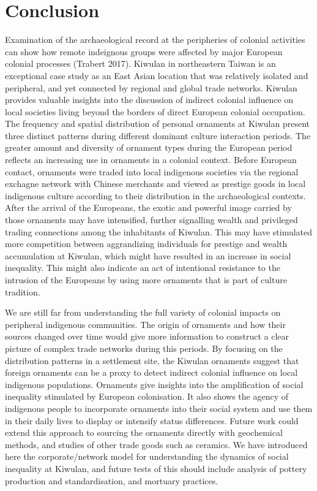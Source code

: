 \documentclass[]{article}
\begin{document}
\hypertarget{conclusion}{%
\section{Conclusion}\label{conclusion}}

Examination of the archaeological record at the peripheries of colonial
activities can show how remote indeignous groups were affected by major
European colonial processes (Trabert 2017). Kiwulan in northeastern
Taiwan is an exceptional case study as an East Asian location that was
relatively isolated and peripheral, and yet connected by regional and
global trade networks. Kiwulan provides valuable insights into the
discussion of indirect colonial influence on local societies living
beyond the borders of direct European colonial occupation. The frequency
and spatial distribution of personal ornaments at Kiwulan present three
distinct patterns during different dominant culture interaction periods.
The greater amount and diversity of ornament types during the European
period reflects an increasing use in ornaments in a colonial context.
Before European contact, ornaments were traded into local indigenous
societies via the regional exchagne network with Chinese merchants and
viewed as prestige goods in local indigenous culture according to their
distribution in the archaeological contexts. After the arrival of the
Europeans, the exotic and powerful image carried by those ornaments may
have intensified, further signalling wealth and privileged trading
connections among the inhabitants of Kiwulan. This may have stimulated
more competition between aggrandizing individuals for prestige and
wealth accumulation at Kiwulan, which might have resulted in an increase
in social inequality. This might also indicate an act of intentional
resistance to the intrusion of the Europeans by using more ornaments
that is part of culture tradition.

We are still far from understanding the full variety of colonial impacts
on peripheral indigenous communities. The origin of ornaments and how
their sources changed over time would give more information to construct
a clear picture of complex trade networks during this periods. By
focusing on the distribution patterns in a settlement site, the Kiwulan
ornaments suggest that foreign ornaments can be a proxy to detect
indirect colonial influence on local indigenous populations. Ornaments
give insights into the amplification of social inequality stimulated by
European colonisation. It also shows the agency of indigenous people to
incorporate ornaments into their social system and use them in their
daily lives to display or intensify status differences. Future work
could extend this approach to sourcing the ornaments directly with
geochemical methods, and studies of other trade goods such as ceramics.
We have introduced here the corporate/network model for understanding
the dynamics of social inequality at Kiwulan, and future tests of this
should include analysis of pottery production and standardisation, and
mortuary practices.
\end{document}
